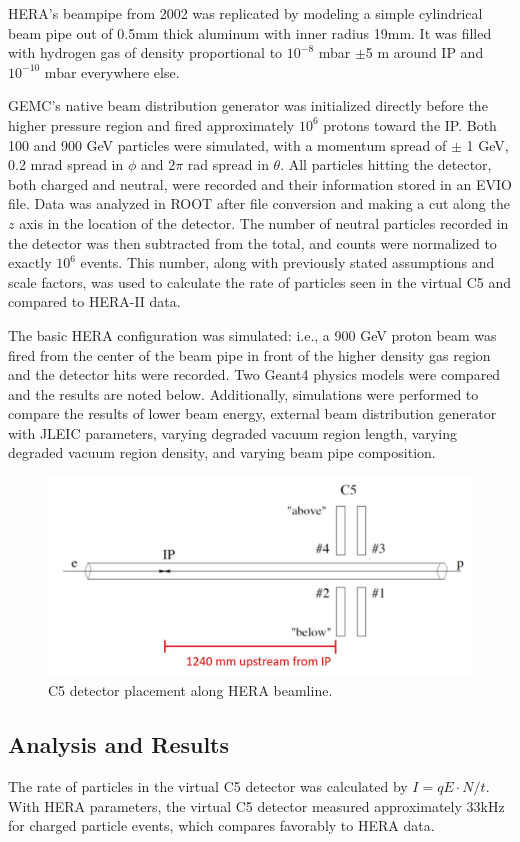 HERA's beampipe from 2002 was replicated by modeling a simple cylindrical beam pipe out of 0.5mm thick aluminum with inner radius 19mm.  It was filled with hydrogen gas of density proportional to  $10^{-8}$ mbar $\pm$5 m around IP and $10^{-10}$ mbar everywhere else.

GEMC's native beam distribution generator was initialized directly before the higher pressure region and fired approximately $10^6$ protons toward the IP.  Both 100 and 900 GeV particles were simulated, with a momentum spread of $\pm$ 1 GeV, 0.2 mrad spread in $\phi$ and $2\pi$ rad spread in $\theta$.  All particles hitting the detector, both charged and neutral, were recorded and their information stored in an EVIO file.  Data was analyzed in ROOT after file conversion and making a cut along the $z$ axis in the location of the detector.  The number of neutral particles recorded in the detector was then subtracted from the total, and counts were normalized to exactly $10^6$ events.  This number, along with previously stated assumptions and scale factors, was used to calculate the rate of particles seen in the virtual C5 and compared to HERA-II data.

The basic HERA configuration was simulated: i.e., a 900 GeV proton beam was fired from the center of the beam pipe in front of the higher density gas region and the detector hits were recorded.  Two Geant4 physics models were compared and the results are noted below.  Additionally, simulations were performed to compare the results of lower beam energy, external beam distribution generator with JLEIC parameters, varying degraded vacuum region length, varying degraded vacuum region density, and varying beam pipe composition.

\begin{figure}[!hbt]
	\centering
	\includegraphics[width=.75\textwidth]{../../img/c5_placement.jpg}
	\caption{C5 detector placement along HERA beamline.}
	\label{fig:hera4}
\end{figure}

\subsection{Analysis and Results}
The rate of particles in the virtual C5 detector was calculated by $I = qE\cdot N/t$.  With HERA parameters, the virtual C5 detector measured approximately 33kHz for charged particle events, which compares favorably to HERA data.  


